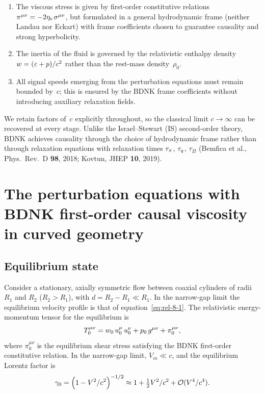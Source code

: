 \begin{enumerate}
\item The viscous stress is given by first-order constitutive relations
  $\pi^{\mu\nu} = -2\eta_{\mathrm{s}}\,\sigma^{\mu\nu}$, but formulated in a
  general hydrodynamic frame (neither Landau nor Eckart) with frame
  coefficients chosen to guarantee causality and strong hyperbolicity.

\item The inertia of the fluid is governed by the relativistic enthalpy
  density $w = (\varepsilon + p)/c^2$ rather than the rest-mass
  density~$\rho_0$.

\item All signal speeds emerging from the perturbation equations must
  remain bounded by~$c$; this is ensured by the BDNK frame coefficients
  without introducing auxiliary relaxation fields.
\end{enumerate}

We retain factors of~$c$ explicitly throughout, so the classical limit
$c \to \infty$ can be recovered at every stage.  Unlike the
Israel--Stewart (IS) second-order theory, BDNK achieves causality through
the choice of hydrodynamic frame rather than through relaxation equations
with relaxation times $\tau_{\pi}$, $\tau_{q}$, $\tau_\Pi$
(Bemfica et al., Phys.\ Rev.\ D \textbf{98}, 2018;
Kovtun, JHEP \textbf{10}, 2019).

\section{The perturbation equations with BDNK first-order causal viscosity
  in curved geometry}
\label{sec:rel-76}

\subsection{Equilibrium state}
\label{sec:rel-76-eq}

Consider a stationary, axially symmetric flow between coaxial cylinders
of radii $R_1$ and $R_2$ ($R_2 > R_1$), with $d = R_2 - R_1 \ll R_1$.
In the narrow-gap limit the equilibrium velocity profile is that of
equation~\eqref{eq:rel-8-1}.  The relativistic energy-momentum tensor for
the equilibrium is
\begin{equation}
\label{eq:rel-8-2}
T^{\mu\nu}_0 = w_0\, u_0^{\mu}\, u_0^{\nu}
  + p_0\, g^{\mu\nu} + \pi_0^{\mu\nu},
\end{equation}
where $\pi_0^{\mu\nu}$ is the equilibrium shear stress satisfying the
BDNK first-order constitutive relation.  In the narrow-gap limit,
$V_m \ll c$, and the equilibrium Lorentz factor is
\begin{equation}
\label{eq:rel-8-3}
\gamma_0 = \Bigl(1 - V^2/c^2\Bigr)^{-1/2}
  \approx 1 + \tfrac{1}{2}V^2/c^2 + \mathcal{O}(V^4/c^4).
\end{equation}

